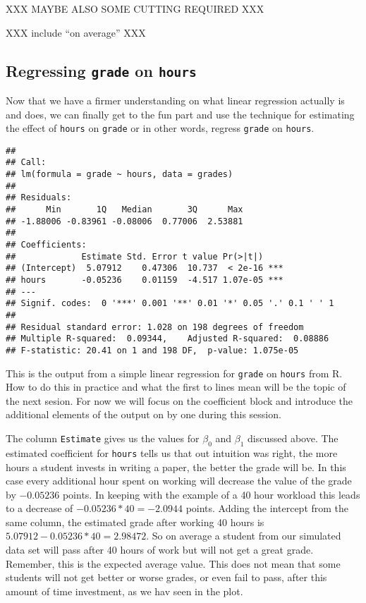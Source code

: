 \documentclass[
]{book}
\begin{document}
XXX MAYBE ALSO SOME CUTTING REQUIRED XXX

XXX include ``on average'' XXX

\hypertarget{regressing-grade-on-hours}{%
\subsection{\texorpdfstring{Regressing \texttt{grade} on \texttt{hours}}{Regressing grade on hours}}\label{regressing-grade-on-hours}}

Now that we have a firmer understanding on what linear regression actually is
and does, we can finally get to the fun part and use the technique for
estimating the effect of \texttt{hours} on \texttt{grade} or in other words, regress
\texttt{grade} on \texttt{hours}.

\begin{verbatim}
## 
## Call:
## lm(formula = grade ~ hours, data = grades)
## 
## Residuals:
##      Min       1Q   Median       3Q      Max 
## -1.88006 -0.83961 -0.08006  0.77006  2.53881 
## 
## Coefficients:
##             Estimate Std. Error t value Pr(>|t|)    
## (Intercept)  5.07912    0.47306  10.737  < 2e-16 ***
## hours       -0.05236    0.01159  -4.517 1.07e-05 ***
## ---
## Signif. codes:  0 '***' 0.001 '**' 0.01 '*' 0.05 '.' 0.1 ' ' 1
## 
## Residual standard error: 1.028 on 198 degrees of freedom
## Multiple R-squared:  0.09344,    Adjusted R-squared:  0.08886 
## F-statistic: 20.41 on 1 and 198 DF,  p-value: 1.075e-05
\end{verbatim}

This is the output from a simple linear regression for \texttt{grade} on \texttt{hours} from
R. How to do this in practice and what the first to lines mean will be the topic
of the next sesion. For now we will focus on the coefficient block and
introduce the additional elements of the output on by one during this session.

The column \texttt{Estimate} gives us the values for \(\beta_0\) and \(\beta_1\) discussed
above. The estimated coefficient for \texttt{hours} tells us that out intuition was
right, the more hours a student invests in writing a paper, the better the grade
will be. In this case every additional hour spent on working will decrease the
value of the grade by \(-0.05236\) points. In keeping with the example of a 40
hour workload this leads to a decrease of \(-0.05236 * 40 = -2.0944\) points.
Adding the intercept from the same column, the estimated grade after working 40
hours is \(5.07912 -0.05236 * 40 = 2.98472\). So on average a student from our
simulated data set will pass after 40 hours of work but will not get a great
grade.
Remember, this is the expected average value. This does not mean that some
students will not get better or worse grades, or even fail to pass, after this
amount of time investment, as we hav seen in the plot.
\end{document}

